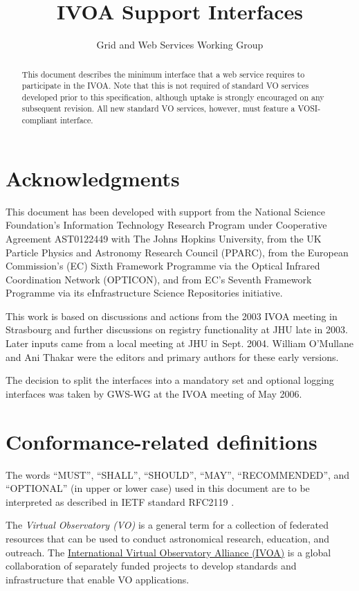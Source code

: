 \documentclass[11pt,letter]{ivoa}
\title{IVOA Support Interfaces}
\author{Grid and Web Services Working Group}
\begin{document}
\begin{abstract}
This document describes the minimum interface that a web service
requires to participate in the IVOA. Note that this is not required of
standard VO services developed prior to this specification, although
uptake is strongly encouraged on any subsequent revision. All new
standard VO services, however, must feature a VOSI-compliant interface. 
\end{abstract}


\section*{Acknowledgments}

This document has been developed with support from the National Science
Foundation's Information Technology Research Program under Cooperative
Agreement AST0122449 with The Johns Hopkins University, from the UK
Particle Physics and Astronomy Research Council (PPARC), from the
European Commission's (EC) Sixth Framework Programme via the Optical
Infrared Coordination Network (OPTICON), and from EC's Seventh Framework
Programme via its eInfrastructure Science Repositories initiative.

This work is based on discussions and actions from the 2003 IVOA meeting
in Strasbourg and further discussions on registry functionality at JHU
late in 2003. Later inputs came from a local meeting at JHU in Sept.
2004. William O'Mullane and Ani Thakar were the editors and primary
authors for these early versions.

The decision to split the interfaces into a mandatory set and optional
logging interfaces was taken by GWS-WG at the IVOA meeting of May 2006. 

\section*{Conformance-related definitions}

The words ``MUST'', ``SHALL'', ``SHOULD'', ``MAY'', ``RECOMMENDED'', and
``OPTIONAL'' (in upper or lower case) used in this document are to be
interpreted as described in IETF standard RFC2119 \citep{std:RFC2119}.

The \emph{Virtual Observatory (VO)} is a
general term for a collection of federated resources that can be used
to conduct astronomical research, education, and outreach.
The \href{http://www.ivoa.net}{International
Virtual Observatory Alliance (IVOA)} is a global
collaboration of separately funded projects to develop standards and
infrastructure that enable VO applications.
\end{document}
